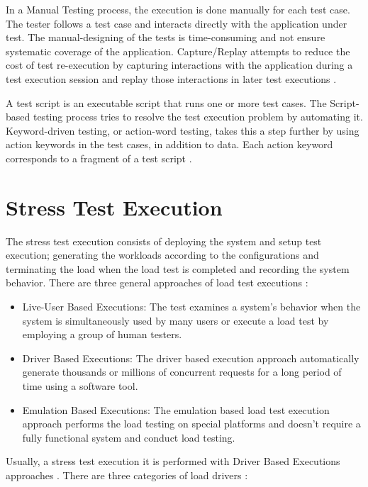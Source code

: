 \documentclass[espaco=umemeio,chapter=TITLE,twoside,openright]{abnt}
\begin{document}
In a Manual Testing process, the execution is done manually for each test case. The tester follows a test case and interacts directly with the application under test. The manual-designing of the tests is time-consuming and not ensure systematic coverage of the application. Capture/Replay attempts to reduce the cost of test re-execution by capturing interactions with the application during a test execution session and replay those interactions in later test executions \cite{utting2010practical}.

A test script is an executable script that runs one or more test cases. The Script-based testing process tries to resolve the test execution problem by automating it. Keyword-driven testing, or action-word testing, takes this a step further by using action keywords in the test cases, in addition to data. Each action keyword corresponds to a fragment of a test script \cite{utting2010practical}.


\section{Stress Test Execution}

The stress test execution consists of deploying the system and setup test execution; generating the workloads according to the configurations and terminating the load when the load test is completed and recording the system behavior. There are three general approaches of load test executions \cite{Molyneaux2009}\cite{Jiang2010}:

\begin{itemize}
\item Live-User Based Executions: The test examines a system’s behavior when the system is simultaneously used by many users or execute a load test by employing a group of human testers.
\item Driver Based Executions: The driver based execution approach automatically generate thousands or millions of concurrent requests for a long period of time using a software tool.
\item Emulation Based Executions: The emulation based load test execution approach performs the load testing on special platforms and doesn't require a fully functional system and conduct load testing.
\end{itemize}

Usually, a stress test execution it is performed with Driver Based Executions approaches \cite{Erinle2013} \cite{MohammadS.Obaidat} \cite{Wang2013}. There are three categories of load drivers \cite{Jiang2010}:
\end{document}

